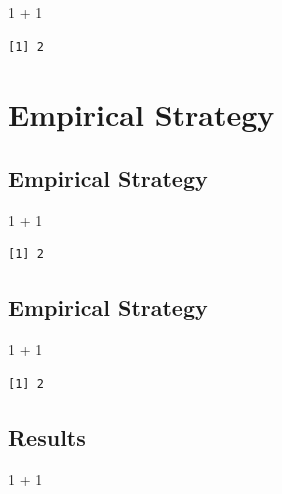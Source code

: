 \documentclass[
  letterpaper,
  DIV=11,
  numbers=noendperiod]{scrreprt}
\newenvironment{Shaded}{\begin{snugshade}}{\end{snugshade}}
\newcommand{\DecValTok}[1]{\textcolor[rgb]{0.68,0.00,0.00}{#1}}
\newcommand{\SpecialCharTok}[1]{\textcolor[rgb]{0.37,0.37,0.37}{#1}}
\begin{document}
\begin{Shaded}
\begin{Highlighting}[]
\DecValTok{1} \SpecialCharTok{+} \DecValTok{1}
\end{Highlighting}
\end{Shaded}

\begin{verbatim}
[1] 2
\end{verbatim}

\part{Empirical Strategy}

\chapter{Empirical Strategy}\label{empirical-strategy-1}

\begin{Shaded}
\begin{Highlighting}[]
\DecValTok{1} \SpecialCharTok{+} \DecValTok{1}
\end{Highlighting}
\end{Shaded}

\begin{verbatim}
[1] 2
\end{verbatim}

\chapter{Empirical Strategy}\label{empirical-strategy-2}

\begin{Shaded}
\begin{Highlighting}[]
\DecValTok{1} \SpecialCharTok{+} \DecValTok{1}
\end{Highlighting}
\end{Shaded}

\begin{verbatim}
[1] 2
\end{verbatim}


\chapter{Results}\label{results}

\begin{Shaded}
\begin{Highlighting}[]
\DecValTok{1} \SpecialCharTok{+} \DecValTok{1}
\end{Highlighting}
\end{Shaded}
\end{document}
